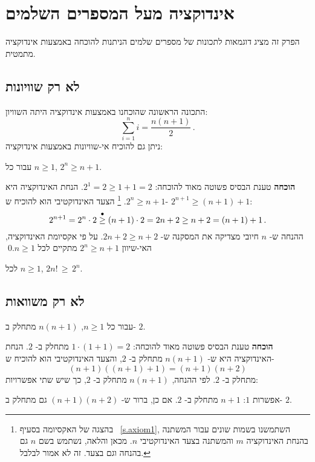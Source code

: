 
\chapter{%
אינדוקציה מעל המספרים השלמים%
}\label{s.integers}

הפרק זה מציג דוגמאות לתכונות של מספרים שלמים הניתנות להוכחה באמצעות אינדוקציה מתמטית.

\section{%
לא רק שוויונות%
}

התכונה הראשונה שהוכחנו באמצעות אינדוקציה היתה השוויון:
\[
\sum_{i=1}^n i = \frac{n(n+1)}{2}\,.
\]
ניתן גם להוכיח אי-שוויונות באמצעות אינדוקציה:
\begin{theorem}
עבור כל
$n\geq 1$, $2^n \geq n+1$.
\end{theorem}

\textbf{הוכחה}
טענת הבסיס פשוטה מאוד להוכחה:
$2^1=2 \geq 1+1 = 2$.
הנחת האינדוקציה היא 
$2^n \geq n+1$.%
\footnote{%
בהצגה של האקסיומה בסעיף~%
\ref{s.axiom1},
השתמשנו בשמות שונים עבור המשתנה בהנחת האינדוקציה
$m$
והמשתנה בצעד האינדוקטיבי
$n$.
מכאן והלאה, נשתמש בשם 
$n$
גם בהנחה וגם בצעד. זה לא אמור לבלבל.%
}
הצעד האינדוקטיבי הוא להוכיח ש-%
$2^{n+1} \geq (n+1)+1$:
\[
2^{n+1}= 2^n\cdot 2 \stackrel{\bullet}{\geq}{} (n+1)\cdot 2 = 2n + 2 \geq n+2 = (n+1)+1\,.
\]
ההנחה ש-
$n$
חיובי מצדיקה את המסקנה ש-%
$2n+2\geq n+2$.
על פי אקסיומת האינדוקציה, האי-שיוון
$2^n \geq n+1$
מתקיים לכל
$n\geq 1$.\qed

\begin{exercise}
לכל
$n\geq 1$, $2n! \,\geq\, 2^n$.
\end{exercise}

\section{%
לא רק משוואות%
}

\begin{theorem}\label{t.div2}
עבור כל
$n\geq 1$, $n(n+1)$
מתחלק ב-%
$2$.
\end{theorem}

\textbf{הוכחה}
טענת הבסיס פשוטה מאוד להוכחה:
$1\cdot (1+1) = 2$
מתחלק ב-%
$2$.
הנחת האינדוקציה היא ש-%
$n(n+1)$
מתחלק ב-%
$2$,
והצעד האינדוקטיבי הוא להוכיח ש-
\[
(n+1)((n+1)+1)=(n+1)(n+2)
\]
מתחלק ב-%
$2$.
לפי ההנחה,
$n(n+1)$
מתחלק ב-%
$2$,
כך שיש שתי אפשרויות:

אפשרות
$1$: $n+1$
מתחלק ב-%
$2$.
אם כן, ברור ש-%
$(n+1)(n+2)$
גם מתחלק ב-%
$2$.

